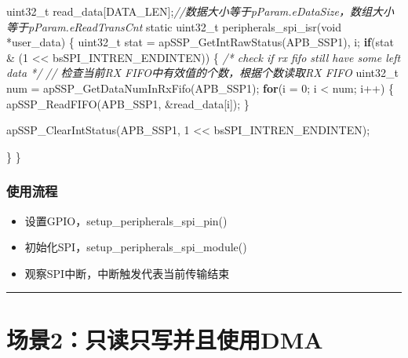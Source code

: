 \documentclass[
  12pt,
]{book}
\newenvironment{Shaded}{\begin{snugshade}}{\end{snugshade}}
\newcommand{\CommentTok}[1]{\textcolor[rgb]{0.56,0.35,0.01}{\textit{#1}}}
\newcommand{\ControlFlowTok}[1]{\textcolor[rgb]{0.13,0.29,0.53}{\textbf{#1}}}
\newcommand{\DataTypeTok}[1]{\textcolor[rgb]{0.13,0.29,0.53}{#1}}
\newcommand{\DecValTok}[1]{\textcolor[rgb]{0.00,0.00,0.81}{#1}}
\newcommand{\NormalTok}[1]{#1}
\providecommand{\tightlist}{%
  \setlength{\itemsep}{0pt}\setlength{\parskip}{0pt}}
\begin{document}
\begin{Shaded}
\begin{Highlighting}[]
\DataTypeTok{uint32_t}\NormalTok{ read_data[DATA_LEN];}\CommentTok{//数据大小等于pParam.eDataSize，数组大小等于pParam.eReadTransCnt}
\DataTypeTok{static} \DataTypeTok{uint32_t}\NormalTok{ peripherals_spi_isr(}\DataTypeTok{void}\NormalTok{ *user_data)}
\NormalTok{\{}
  \DataTypeTok{uint32_t}\NormalTok{ stat = apSSP_GetIntRawStatus(APB_SSP1), i;}
  \ControlFlowTok{if}\NormalTok{(stat & (}\DecValTok{1}\NormalTok{ << bsSPI_INTREN_ENDINTEN))}
\NormalTok{  \{}
    \CommentTok{/* check if rx fifo still have some left data */}
    \CommentTok{// 检查当前RX FIFO中有效值的个数，根据个数读取RX FIFO}
    \DataTypeTok{uint32_t}\NormalTok{ num = apSSP_GetDataNumInRxFifo(APB_SSP1);}
    \ControlFlowTok{for}\NormalTok{(i = }\DecValTok{0}\NormalTok{; i < num; i++)}
\NormalTok{    \{}
\NormalTok{      apSSP_ReadFIFO(APB_SSP1, &read_data[i]);}
\NormalTok{    \}}

\NormalTok{    apSSP_ClearIntStatus(APB_SSP1, }\DecValTok{1}\NormalTok{ << bsSPI_INTREN_ENDINTEN);}
    
\NormalTok{  \}}
\NormalTok{\}}
\end{Highlighting}
\end{Shaded}

\hypertarget{ux4f7fux7528ux6d41ux7a0b-9}{%
\subsubsection{使用流程}\label{ux4f7fux7528ux6d41ux7a0b-9}}

\begin{itemize}
\tightlist
\item
  设置GPIO，setup\_peripherals\_spi\_pin()
\item
  初始化SPI，setup\_peripherals\_spi\_module()
\item
  观察SPI中断，中断触发代表当前传输结束
\end{itemize}

\begin{center}\rule{0.5\linewidth}{0.5pt}\end{center}

\hypertarget{ux573aux666f2ux53eaux8bfbux53eaux5199ux5e76ux4e14ux4f7fux7528dma}{%
\section{场景2：只读只写并且使用DMA}\label{ux573aux666f2ux53eaux8bfbux53eaux5199ux5e76ux4e14ux4f7fux7528dma}}
\end{document}
